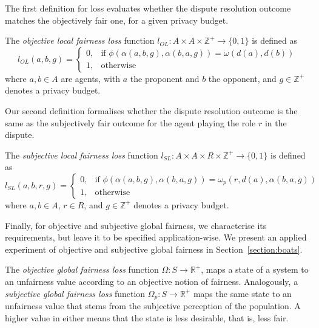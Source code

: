 \documentclass[acmsmall]{custom-arxiv}  %
\begin{document}
The first definition for loss evaluates whether the dispute resolution outcome matches the objectively fair one, for a given privacy budget.

\begin{definition}
\label{definition:objective-local-loss}
The \textit{objective local fairness loss} function $l_{OL}: A \times A \times \mathbb{Z}^{+} \rightarrow \{0, 1\}$ is defined as 
\[
    l_{OL}(a, b, g) = 
        \begin{cases} 
          0, & \text{if } \phi(\alpha(a, b, g), \alpha(b, a, g)) = \omega(d(a), d(b)) \\
          1, & \text{otherwise}
        \end{cases}
\]
where $a, b \in A$ are agents, with $a$ the proponent and $b$ the opponent, and $g \in \mathbb{Z}^{+}$ denotes a privacy budget.
\end{definition}


Our second definition formalises whether the dispute resolution outcome is the same as the subjectively fair outcome for the agent playing the role $r$ in the dispute.

\begin{definition}
\label{definition:subjective-local-loss}
The \textit{subjective local fairness loss} function $l_{SL}: A \times A \times R \times \mathbb{Z}^{+} \rightarrow \{0, 1\}$ is defined as 
\[
    l_{SL}(a, b, r, g) = 
        \begin{cases} 
          0, & \text{if } \phi(\alpha(a, b, g), \alpha(b, a, g)) = \omega_p(r, d(a), \alpha(b, a, g)) \\
          1, & \text{otherwise}
        \end{cases}    
\]
where $a, b \in A$, $r \in R$, and $g \in \mathbb{Z}^{+}$ denotes a privacy budget. %
\end{definition}

Finally, for objective and subjective global fairness, we characterise its requirements, but leave it to be specified application-wise. We present an applied experiment of objective and subjective global fairness in Section~\ref{section:boats}.

\begin{definition}
  \label{definition:objective-global-loss}
  The \textit{objective global fairness loss} function $\Omega: S \rightarrow \mathbb{R}^{+}$, maps a state of a system to an unfairness value according to an objective notion of fairness. Analogously, a \textit{subjective global fairness loss} function $\Omega_p: S \rightarrow \mathbb{R}^{+}$ maps the same state to an unfairness value that stems from the subjective perception of the population. A higher value in either means that the state is less desirable, that is, less fair.
\end{definition}
\end{document}
